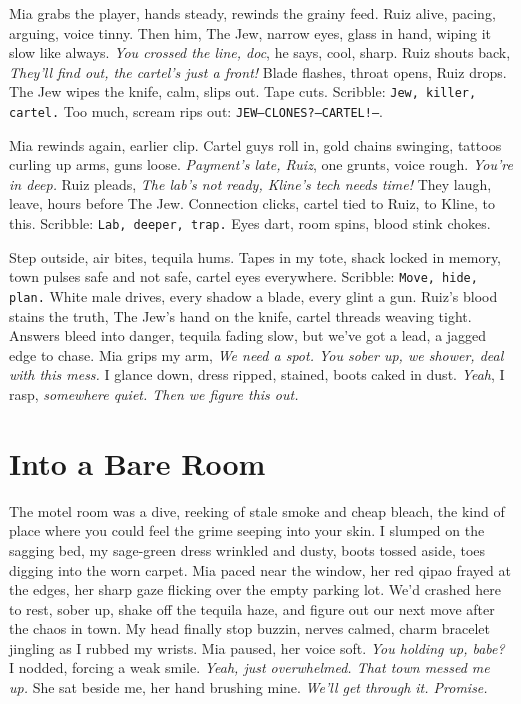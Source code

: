 \documentclass[12pt,oneside]{book} %
\newcommand{\note}[1]{\texttt{#1}}
\begin{document}
Mia grabs the player, hands steady, rewinds the grainy feed. Ruiz alive, pacing, arguing, voice tinny. Then him, The Jew, narrow eyes, glass in hand, wiping it slow like always. \textit{You crossed the line, doc}, he says, cool, sharp. Ruiz shouts back, \textit{They’ll find out, the cartel’s just a front!} Blade flashes, throat opens, Ruiz drops. The Jew wipes the knife, calm, slips out. Tape cuts. Scribble: \note{Jew, killer, cartel.} Too much, scream rips out: \note{JEW—CLONES?—CARTEL!—}.

Mia rewinds again, earlier clip. Cartel guys roll in, gold chains swinging, tattoos curling up arms, guns loose. \textit{Payment’s late, Ruiz}, one grunts, voice rough. \textit{You’re in deep.} Ruiz pleads, \textit{The lab’s not ready, Kline’s tech needs time!} They laugh, leave, hours before The Jew. Connection clicks, cartel tied to Ruiz, to Kline, to this. Scribble: \note{Lab, deeper, trap.} Eyes dart, room spins, blood stink chokes.

Step outside, air bites, tequila hums. Tapes in my tote, shack locked in memory, town pulses safe and not safe, cartel eyes everywhere. Scribble: \note{Move, hide, plan.} White male drives, every shadow a blade, every glint a gun. Ruiz’s blood stains the truth, The Jew’s hand on the knife, cartel threads weaving tight. Answers bleed into danger, tequila fading slow, but we’ve got a lead, a jagged edge to chase. Mia grips my arm, \textit{We need a spot. You sober up, we shower, deal with this mess.} I glance down, dress ripped, stained, boots caked in dust. \textit{Yeah}, I rasp, \textit{somewhere quiet. Then we figure this out.}

\chapter{Into a Bare Room}

The motel room was a dive, reeking of stale smoke and cheap bleach, the kind of place where you could feel the grime seeping into your skin. I slumped on the sagging bed, my sage-green dress wrinkled and dusty, boots tossed aside, toes digging into the worn carpet. Mia paced near the window, her red qipao frayed at the edges, her sharp gaze flicking over the empty parking lot. We’d crashed here to rest, sober up, shake off the tequila haze, and figure out our next move after the chaos in town. My head finally stop buzzin, nerves calmed, charm bracelet jingling as I rubbed my wrists. Mia paused, her voice soft. \textit{You holding up, babe?} I nodded, forcing a weak smile. \textit{Yeah, just overwhelmed. That town messed me up.} She sat beside me, her hand brushing mine. \textit{We’ll get through it. Promise.}
\end{document}
